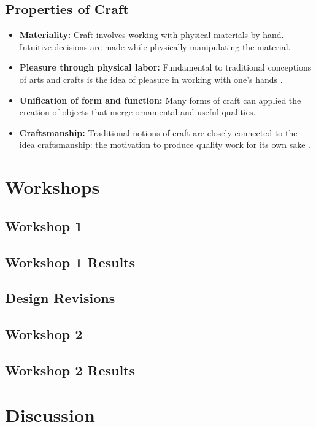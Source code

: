 \documentclass{sigchi}
\begin{document}
\subsection{Properties of Craft}
\begin{itemize}
\item \textbf{Materiality:} Craft involves working with physical materials by hand. Intuitive decisions are made while physically manipulating the material. 
\vspace{-6pt}
\item \textbf{Pleasure through physical labor:} Fundamental to traditional conceptions of arts and crafts is the idea of pleasure in working with one's hands \cite{abstracting_craft}.
\vspace{-6pt}
\item \textbf{Unification of form and function:} Many forms of craft can applied the creation of objects that merge ornamental and useful qualities.
\vspace{-6pt}
\item \textbf{Craftsmanship:} Traditional notions of craft are closely connected to the idea craftsmanship: the motivation to produce quality work for its own sake \cite{the_craftsman}.
\end{itemize}


\section{Workshops}
\subsection{Workshop 1}
\subsection{Workshop 1 Results}
\subsection{Design Revisions}
\subsection{Workshop 2}
\subsection{Workshop 2 Results}

\section{Discussion}
\end{document}
